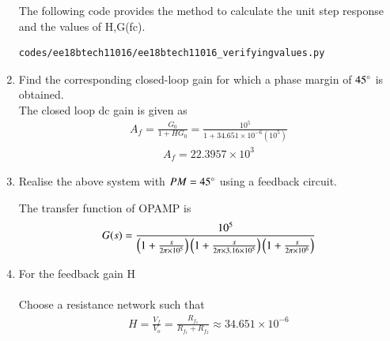 \begin{enumerate}[label=\arabic*.,ref=\theenumi]
The following code provides the method to calculate the unit step response and the values of H,G(fc).
\begin{lstlisting}
codes/ee18btech11016/ee18btech11016_verifyingvalues.py
\end{lstlisting}
\item Find the corresponding closed-loop gain for which a phase margin of $45\degree$ is obtained.\\
\solution The closed loop dc gain is given as
\begin{align}
A_{f} = \frac{G_{0}}{1+HG_{0}}=\frac{10^5}{1+34.651\times10^{-6}(10^5)}
\end{align} 
\begin{align}
A_{f} = 22.3957\times10^3
\end{align}


\item Realise the above system with $PM = 45 \degree$ using a feedback circuit.\\
\solution
\begin{figure}[ht!]
	\begin{center}
		\resizebox{\columnwidth/1}{!}{}
	\end{center}
	\caption{}
	\label{fig:ee18btech11016_figa}
\end{figure}

The transfer function of OPAMP is
\begin{align}
    G(s) = \frac{10^{5}}{\left(1+\frac{s}{2\pi \times 10^5}\right)\left(1+\frac{s}{2\pi \times3.16 \times 10^{5}}\right)\left(1+\frac{s}{2\pi \times 10^{6}}\right)}
\end{align}
%
\item For the feedback gain H\\
\solution\\
Choose a resistance network such that
\begin{align}
    H = \frac{V_{f}}{V_{o}} = \frac{R_{f_{1}}}{R_{f_{1}}+R_{f_{2}}} \approx 34.651\times10^{-6}
\end{align}
\begin{figure}[ht!]
	\begin{center}
		\resizebox{\columnwidth/2}{!}{}
	\end{center}
	\caption{}
	\label{fig:ee18btech11016_figb}
\end{figure}


\end{enumerate}
